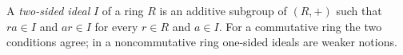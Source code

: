 
A \emph{two-sided ideal} $I$ of a ring $R$ is an additive subgroup of $(R,+)$ such that $r a\in I$ and $a r\in I$ for every $r\in R$ and $a\in I$. For a commutative ring the two conditions agree; in a noncommutative ring one-sided ideals are weaker notions.
